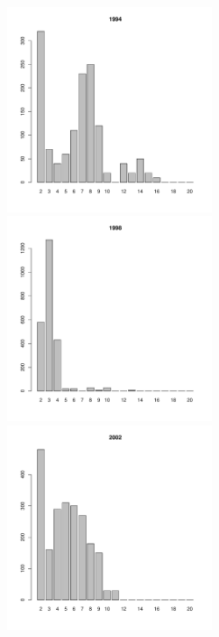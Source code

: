 \begin{figure}[hp]
	\begin{minipage}[b]{.3\linewidth}
	\begin{center}
	\includegraphics[width=60mm]{../White_Sea/Luvenga_Goreliy/middle2_1994_.pdf}
	\end{center}
	\end{minipage}
	\hfill
	\begin{minipage}[b]{.3\linewidth}
	\begin{center}
	\includegraphics[width=60mm]{../White_Sea/Luvenga_Goreliy/middle2_1998_.pdf}
	\end{center}
	\end{minipage}	
	\hfill
	\begin{minipage}[b]{.3\linewidth}
	\begin{center}
	\includegraphics[width=60mm]{../White_Sea/Luvenga_Goreliy/middle2_2002_.pdf}
	\end{center}
	\end{minipage}


\end{figure}
